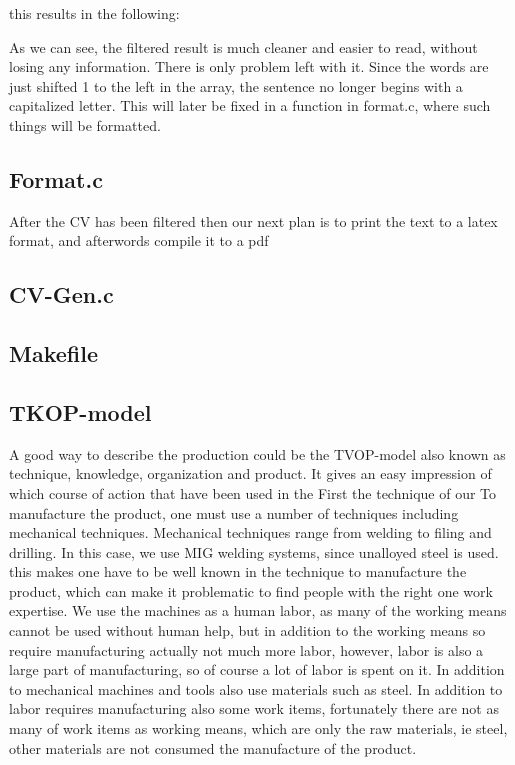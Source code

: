 this results in the following:

As we can see, the filtered result is much cleaner and easier to read, without losing any information.
There is only problem left with it. Since the words are just shifted 1 to the left in the array, the sentence no longer begins
with a capitalized letter. This will later be fixed in a function in format.c, where such things will be formatted.

\subsection{Format.c}
After the CV has been filtered then our next plan is to print the text to a latex format, and afterwords compile it to a pdf 

\subsection{CV-Gen.c}
\subsection{Makefile}

\subsection{TKOP-model}
A good way to describe the production could be the TVOP-model also known as technique, knowledge, organization and product.
It gives an easy impression of which course of action that have been used in the 
First the technique of our
To manufacture the product, one must use a number of techniques including mechanical techniques.
Mechanical techniques range from welding to filing and drilling. In this case, we use MIG welding systems, since unalloyed steel is used. this makes one have to be well known in the technique to
manufacture the product, which can make it problematic to find people with the right one
work expertise. We use the machines as a human labor, as many of
the working means cannot be used without human help, but in addition to the working means so require
manufacturing actually not much more labor, however, labor is also a large part of
manufacturing, so of course a lot of labor is spent on it. In addition to mechanical
machines and tools also use materials such as steel. In addition to labor requires
manufacturing also some work items, fortunately there are not as many of work items as
working means, which are only the raw materials, ie steel, other materials are not consumed
the manufacture of the product.
